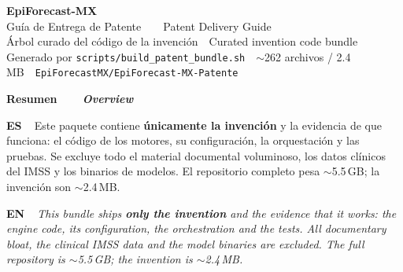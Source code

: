 \documentclass[10pt]{article}
\newcommand{\msec}[2]{\vspace{8pt}\par
  {\hf\bfseries\large\color{indigo}#1\ \ \textcolor{accent}{\textbar}\ \ {\itshape\mdseries\color{soft}#2}}\par
  \vspace{1pt}{\color{accent}\hrule height 1.3pt}\vspace{5pt}}
\newcommand{\es}[1]{{\small\textbf{\color{indigo}ES\ \ }#1}\par}
\newcommand{\en}[1]{{\small\textbf{\color{accent}EN\ \ }\itshape#1}\par}
\begin{document}
\begin{center}
{\hf\bfseries\fontsize{26}{30}\selectfont\color{indigo}EpiForecast-MX}\\[3pt]
{\hf\Large\color{ink}Guía de Entrega de Patente\ \ \textcolor{accent}{\textbar}\ \ Patent Delivery Guide}\\[7pt]
{\color{soft}Árbol curado del código de la invención\ \textbullet\ Curated invention code bundle}\\[2pt]
{\color{soft}\footnotesize Generado por \texttt{scripts/build\_patent\_bundle.sh}\ \textbullet\ $\sim$262 archivos / 2.4 MB\ \textbullet\ \texttt{EpiForecastMX/EpiForecast-MX-Patente}}
\end{center}
\vspace{6pt}

\msec{Resumen}{Overview}
\es{Este paquete contiene \textbf{únicamente la invención} y la evidencia de que funciona: el código de los motores, su configuración, la orquestación y las pruebas. Se excluye todo el material documental voluminoso, los datos clínicos del IMSS y los binarios de modelos. El repositorio completo pesa $\sim$5.5\,GB; la invención son $\sim$2.4\,MB.}
\en{This bundle ships \textbf{only the invention} and the evidence that it works: the engine code, its configuration, the orchestration and the tests. All documentary bloat, the clinical IMSS data and the model binaries are excluded. The full repository is $\sim$5.5\,GB; the invention is $\sim$2.4\,MB.}
\end{document}
